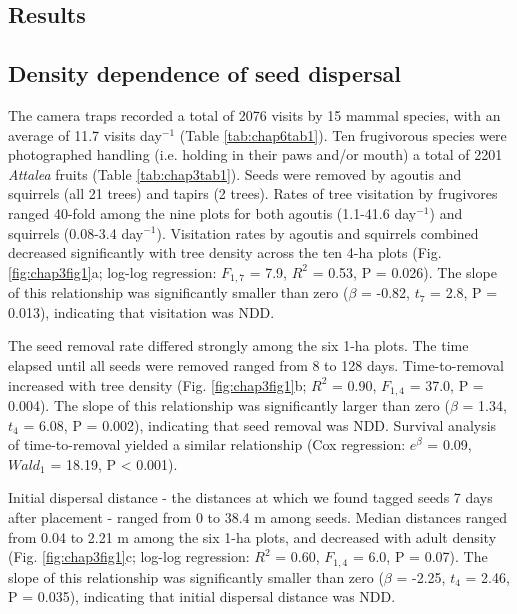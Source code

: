 \documentclass[b5paper,justified]{tufte-book} %
\begin{document}
\begin{fullwidth}
\section{Results}

\subsection{Density dependence of seed dispersal}

The camera traps recorded a total of 2076 visits by 15 mammal species, with an average of 11.7 visits day$^{-1}$ (Table \ref{tab:chap6tab1}). Ten frugivorous species were photographed handling (i.e. holding in their paws and/or mouth) a total of 2201 \textit{Attalea} fruits (Table \ref{tab:chap3tab1}). Seeds were removed by agoutis and squirrels (all 21 trees) and tapirs (2 trees). Rates of tree visitation by frugivores ranged 40-fold among the nine plots for both agoutis (1.1-41.6 day$^{-1}$) and squirrels (0.08-3.4 day$^{-1}$). Visitation rates by agoutis and squirrels combined decreased significantly with tree density across the ten 4-ha plots (Fig. \ref{fig:chap3fig1}a; log-log regression: $F_{1,7}$ = 7.9, $R^2$ = 0.53, P = 0.026). The slope of this relationship was significantly smaller than zero ($\beta$ = -0.82, $t_7$ = 2.8, P = 0.013), indicating that visitation was NDD.

The seed removal rate differed strongly among the six 1-ha plots. The time elapsed until all seeds were removed ranged from 8 to 128 days. Time-to-removal increased with tree density (Fig. \ref{fig:chap3fig1}b; $R^2$ = 0.90, $F_{1,4}$ = 37.0, P = 0.004). The slope of this relationship was significantly larger than zero ($\beta$ = 1.34, $t_4$ = 6.08, P = 0.002), indicating that seed removal was NDD. Survival analysis of time-to-removal yielded a similar relationship (Cox regression: $e^\beta$ = 0.09, $Wald_1$ = 18.19, P < 0.001). 

Initial dispersal distance - the distances at which we found tagged seeds 7 days after placement - ranged from 0 to 38.4 m among seeds. Median distances ranged from 0.04 to 2.21 m among the six 1-ha plots, and decreased with adult density (Fig. \ref{fig:chap3fig1}c; log-log regression: $R^2$ = 0.60, $F_{1,4}$ = 6.0, P = 0.07). The slope of this relationship was significantly smaller than zero ($\beta$ = -2.25, $t_4$ = 2.46, P = 0.035), indicating that initial dispersal distance was NDD. 


\end{fullwidth}
\end{document}
